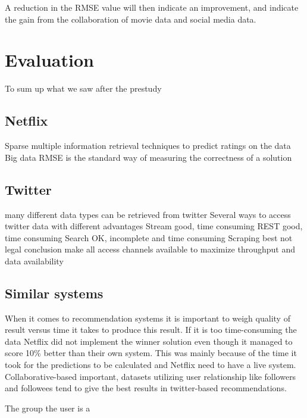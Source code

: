 A reduction in the RMSE value will then indicate an improvement, and indicate the gain from the collaboration of movie data and social media data.

\section{Evaluation}
To sum up what we saw after the prestudy

\subsection{Netflix}
Sparse
multiple information retrieval techniques to predict ratings on the data
Big data
RMSE is the standard way of measuring the correctness of a solution

\subsection{Twitter}
many different data types can be retrieved from twitter
Several ways to access twitter data with different advantages
Stream good, time consuming
REST good, time consuming
Search OK, incomplete and time consuming
Scraping best not legal
conclusion make all access channels available to maximize throughput and data availability

\subsection{Similar systems}
When it comes to recommendation systems it is important to weigh quality of result versus time it takes to produce this result. If it is too time-consuming the data
Netflix did not implement the winner solution even though it managed to score 10\% better than their own system. This was mainly because of the time it took for the predictions to be calculated and Netflix need to have a live system.
Collaborative-based important, datasets utilizing user relationship like followers and followees tend to give the best results in twitter-based recommendations.

The group the user is a
